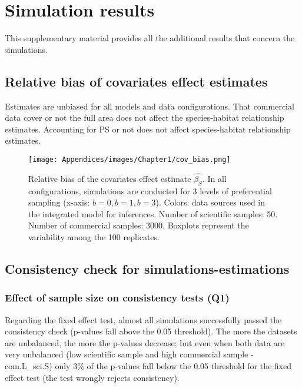 \clearpage

\section{Simulation results}\label{appendix:SimuRes}

This supplementary material provides all the additional results that concern the simulations.

\subsection{Relative bias of covariates effect estimates}\label{appendix:CovBias}

Estimates are unbiased far all models and data configurations. That commercial data cover or not the full area does not affect the species-habitat relationship estimates. Accounting for PS or not does not affect species-habitat relationship estimates.

\begin{figure}[H]
   \begin{center}
      \texttt{[image: Appendices/images/Chapter1/cov\_bias.png]}
   \end{center}
   \caption[Relative bias of the covariates effect estimate \(\hat{\beta_S}\).]
   {Relative bias of the covariates effect estimate \(\hat{\beta_S}\). In all configurations, simulations are conducted for 3 levels of preferential sampling (x-axis: \(b = 0, b = 1, b = 3\)). Colors: data sources used in the integrated model for inferences. Number of scientific samples: 50. Number of commercial samples: 3000. Boxplots represent the variability among the 100 replicates.}
   \label{fig:CovBias}
\end{figure}

\clearpage

\subsection{Consistency check for simulations-estimations}

\subsubsection{Effect of sample size on consistency tests (Q1)}\label{appendix:PvalSimu1}

Regarding the fixed effect test, almost all simulations successfully passed the consistency check (p-values fall above the 0.05 threshold). The more the datasets are unbalanced, the more the p-values decrease; but even when both data are very unbalanced (low scientific sample and high commercial sample  - com.L_sci.S) only 3\% of the p-values fall below the 0.05 threshold for the fixed effect test (the test wrongly rejects consistency).

